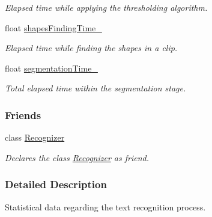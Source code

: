 \begin{CompactItemize}
\begin{CompactList}\small\item\em Elapsed time while applying the thresholding algorithm. \item\end{CompactList}\item 
\hypertarget{class_statistics_182c5f187a09c799cf37338b73ae37cd}{
float \hyperlink{class_statistics_182c5f187a09c799cf37338b73ae37cd}{shapesFindingTime\_\-}}
\label{class_statistics_182c5f187a09c799cf37338b73ae37cd}

\begin{CompactList}\small\item\em Elapsed time while finding the shapes in a clip. \item\end{CompactList}\item 
\hypertarget{class_statistics_c08594d7ee04aac7e88d62c5abe20b1f}{
float \hyperlink{class_statistics_c08594d7ee04aac7e88d62c5abe20b1f}{segmentationTime\_\-}}
\label{class_statistics_c08594d7ee04aac7e88d62c5abe20b1f}

\begin{CompactList}\small\item\em Total elapsed time within the segmentation stage. \item\end{CompactList}\end{CompactItemize}
\subsubsection*{Friends}
\begin{CompactItemize}
\item 
\hypertarget{class_statistics_11123fa51c07995419270030024a7dfe}{
class \hyperlink{class_statistics_11123fa51c07995419270030024a7dfe}{Recognizer}}
\label{class_statistics_11123fa51c07995419270030024a7dfe}

\begin{CompactList}\small\item\em Declares the class \hyperlink{class_recognizer}{Recognizer} as friend. \item\end{CompactList}\end{CompactItemize}


\subsubsection{Detailed Description}
Statistical data regarding the text recognition process. 


